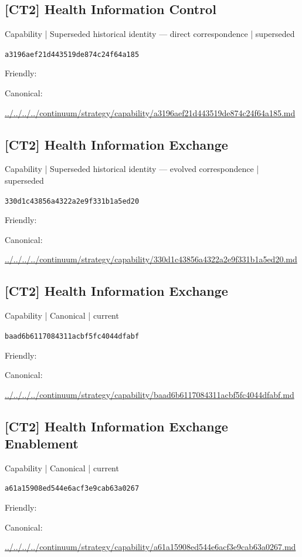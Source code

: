 \documentclass[10pt,a4paper]{article}
\begin{document}
\subsection*{[CT2] Health Information Control}
{\small Capability | Superseded historical identity — direct correspondence | superseded}\par
\texttt{a3196aef21d443519de874c24f64a185}\par
Friendly: \par
Canonical: \par
{\footnotesize\url{../../../../continuum/strategy/capability/a3196aef21d443519de874c24f64a185.md}}\par
\subsection*{[CT2] Health Information Exchange}
{\small Capability | Superseded historical identity — evolved correspondence | superseded}\par
\texttt{330d1c43856a4322a2e9f331b1a5ed20}\par
Friendly: \par
Canonical: \par
{\footnotesize\url{../../../../continuum/strategy/capability/330d1c43856a4322a2e9f331b1a5ed20.md}}\par
\subsection*{[CT2] Health Information Exchange}
{\small Capability | Canonical | current}\par
\texttt{baad6b6117084311acbf5fc4044dfabf}\par
Friendly: \par
Canonical: \par
{\footnotesize\url{../../../../continuum/strategy/capability/baad6b6117084311acbf5fc4044dfabf.md}}\par
\subsection*{[CT2] Health Information Exchange Enablement}
{\small Capability | Canonical | current}\par
\texttt{a61a15908ed544e6acf3e9cab63a0267}\par
Friendly: \par
Canonical: \par
{\footnotesize\url{../../../../continuum/strategy/capability/a61a15908ed544e6acf3e9cab63a0267.md}}\par
\end{document}
